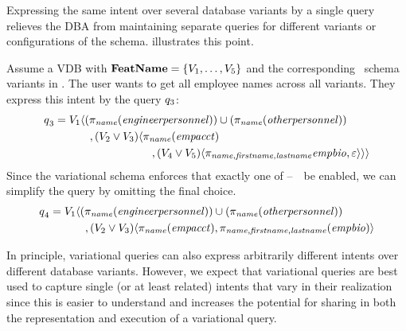  Expressing
the same intent over several database variants by a single query relieves the DBA from
maintaining separate queries for different variants or configurations of the
schema.
illustrates this point.

\begin{example}
\label{eg:vq-same-intent-mult-vars}
Assume a VDB with  \ensuremath{\fSet = \setDef{\vOne, \ldots, \vFive}}
and the corresponding \basic\ schema
variants in . The user wants to get all employee names across all
variants. They express this intent by the query $\vQ_3$:
%
\begin{align*}
\vQ_3 &= 
  \vOne\chcL
    (\pi_{\name}(\engemp)) \cup (\pi_{\name}(\othemp)) \\
 & \hspace{32pt},
    (\vTwo\vee\vThree)\chcL
      \pi_{\name}(\empacct) \\
 & \hspace{88pt},
      \chc[(\vFour\vee\vFive)]{\pi_{\name,\fname,\lname}\empbio, \emp}\chcR\chcR
\end{align*}
%
Since the variational schema enforces that exactly one of \vOne--\ \vFive\ be enabled, we
can simplify the query by omitting the final choice.
%
\begin{align*}
\vQ_4 &= 
  \vOne\chcL
    (\pi_{\name}(\engemp)) \cup (\pi_{\name}(\othemp)) \\
 & \hspace{32pt},
    \chc[(\vTwo\vee\vThree)]{
      \pi_{\name}(\empacct),
      \pi_{\name,\fname,\lname}(\empbio)}
\end{align*}
%
\end{example}

In principle, variational queries can also express arbitrarily different intents over
different database variants. However, we expect that variational queries are best used to
capture single (or at least related) intents that vary in their realization
since this is easier to understand and increases the potential for sharing in
both the representation and execution of a variational query.






